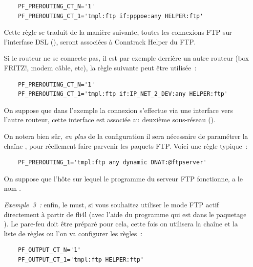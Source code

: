 \begin{example}
\begin{verbatim}
    PF_PREROUTING_CT_N='1'
    PF_PREROUTING_CT_1='tmpl:ftp if:pppoe:any HELPER:ftp'
\end{verbatim}
\end{example}

Cette règle se traduit de la manière suivante, toutes les connexions FTP sur
l'interfase DSL (), seront associées à Conntrack Helper du FTP.

Si le routeur ne se connecte pas, il est par exemple derrière un autre routeur
(box FRITZ!, modem câble, etc), la règle suivante peut être utilisée~:

\begin{example}
\begin{verbatim}
    PF_PREROUTING_CT_N='1'
    PF_PREROUTING_CT_1='tmpl:ftp if:IP_NET_2_DEV:any HELPER:ftp'
\end{verbatim}
\end{example}

  On suppose que dans l'exemple la connexion s'effectue via une interface vers
  l'autre routeur, cette interface est associée au deuxième sous-réseau
  ().

  On notera bien sûr, \emph{en plus} de la configuration il sera nécessaire de
  paramétrer la chaîne , pour réellement faire parvenir les
  paquets FTP. Voici une règle typique~:

  \begin{example}
\begin{verbatim}
    PF_PREROUTING_1='tmpl:ftp any dynamic DNAT:@ftpserver'
\end{verbatim}
\end{example}

   On suppose que l'hôte sur lequel le programme du serveur FTP fonctionne,
   a le nom .

\emph{Exemple~3~:} enfin, le must, si vous souhaitez utiliser le mode FTP actif
  directement à partir de fli4l (avec l'aide du programme  qui est
  dans le paquetage ). Le pare-feu doit être préparé pour cela,
  cette fois on utilisera la chaîne  et la liste de règles
   ou l'on va configurer les règles~:

\begin{example}
\begin{verbatim}
    PF_OUTPUT_CT_N='1'
    PF_OUTPUT_CT_1='tmpl:ftp HELPER:ftp'
\end{verbatim}
\end{example}

